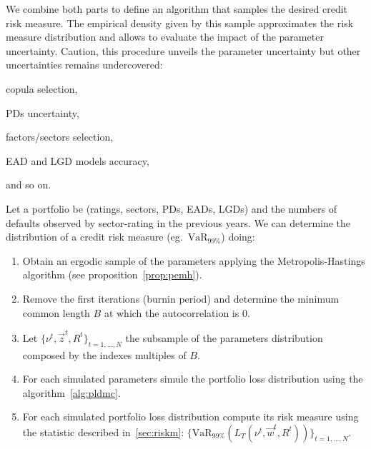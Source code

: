 \documentclass[11pt,fleqn]{book} %
\begin{document}
We combine both parts to define an algorithm that samples the desired
credit risk measure. The empirical density given by this sample 
approximates the risk measure distribution and allows to evaluate the 
impact of the parameter uncertainty. Caution, this procedure unveils the 
parameter uncertainty but other uncertainties remains undercovered:
\begin{inparaenum}[1)]
	\item copula selection, 
	\item PDs uncertainty,
	\item factors/sectors selection,
	\item EAD and LGD models accuracy,
	\item and so on.
\end{inparaenum}

\begin{algorithm}
	\label{alg:crmd}
	Let a portfolio be (ratings, sectors, PDs, EADs, LGDs) and the numbers 
	of defaults observed by sector-rating in the previous years. We can
	determine the distribution of a credit risk measure 
	(eg.\ $\text{VaR}_{99\%}$) doing:
	\begin{enumerate}
		\item Obtain an ergodic sample of the parameters applying the
		Metropolis-Hastings algorithm (see proposition~\ref{prop:pemh}).
		\item Remove the first iterations (burnin period) and determine
		the minimum common length $B$ at which the autocorrelation is $0$.
		\item Let $\{\nu^t, \vec{z}^t, R^t\}_{t=1,\dots,N}$ the subsample
		of the parameters distribution composed by the indexes multiples 
		of $B$.
		\item For each simulated parameters simule the portfolio loss 
		distribution using the algorithm~\ref{alg:pldmc}.
		\item For each simulated portfolio loss distribution compute its 
		risk measure using the statistic described in~\ref{sec:riskm}:
		$\{\text{VaR}_{99\%}(L_T(\nu^t,\vec{w}^t,R^t))\}_{t=1,\dots,N}$.
	\end{enumerate}
\end{algorithm}
\end{document}
